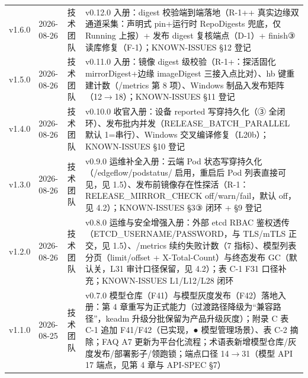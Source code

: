 \documentclass[10.5pt,a4paper,openany]{ctexbook}
\begin{document}
\begin{tabularx}{\textwidth}{p{1.4cm}p{2.2cm}p{3cm}X}
v1.6.0 & 2026-08-26 & 技术团队 & v0.12.0 入册：digest 校验端到端落地（R-1++ 真实边缘双通道采集：声明式 pin+运行时 RepoDigests 兜底，仅 Running 上报）+ 发布 digest 复核端点（D-1）+ finish③ 读库修复（F-1）；KNOWN-ISSUES §12 登记\\
v1.5.0 & 2026-08-26 & 技术团队 & v0.11.0 入册：镜像 digest 级校验（R-1+：探活固化 mirrorDigest+边缘 imageDigest 三接入点比对）、hb 键重建计数（/metrics 第 8 项）、Windows 制品入发布矩阵（12$\rightarrow$18）；KNOWN-ISSUES §11 登记\\
v1.4.0 & 2026-08-26 & 技术团队 & v0.10.0 收官入册：设备 reported 写穿持久化（③ 全闭环）、发布批内并发（RELEASE\_BATCH\_PARALLEL 默认 1=串行）、Windows 交叉编译修复（L20b）；KNOWN-ISSUES §10 登记\\
v1.3.0 & 2026-08-26 & 技术团队 & v0.9.0 运维补全入册：云端 Pod 状态写穿持久化（/edgeflow/podstatus/ 启用，重启后 Pod 列表直接可见，见 1.5）、发布前镜像存在性探活（R-1：RELEASE\_MIRROR\_CHECK off/warn/fail，默认 off，见 4.2）；KNOWN-ISSUES §3③ 闭环 + §9 登记\\
v1.2.0 & 2026-08-26 & 技术团队 & v0.8.0 运维与安全增强入册：外部 etcd RBAC 鉴权透传（ETCD\_USERNAME/PASSWORD，与 TLS/mTLS 正交，见 1.5）、/metrics 续约失败计数（7 指标）、模型列表分页（limit/offset + X-Total-Count）与终态发布 GC（默认关，L31 审计口径保留，见 4.2）；表 C-1 F31 口径补充；KNOWN-ISSUES L1/L12/L28 闭环\\
v1.1.0 & 2026-08-25 & 技术团队 & v0.7.0 模型仓库（F41）与模型灰度发布（F42）落地入册：第 4 章重写为正式能力（过渡路径降级为“兼容路径”，keadm 升级分批保留为产品升级灰度）；附录 C 表 C-1 追加 F41/F42（已实现，● 模型管理场景）、表 C-2 摘除；FAQ A7 更新为平台化流程；术语表新增模型仓库/灰度发布/部署影子/领跑锁；端点口径 14$\rightarrow$31（模型 API 17 端点，见第 4 章与 API-SPEC §7）\\
\bottomrule
\end{tabularx}

\tableofcontents








\end{document}
